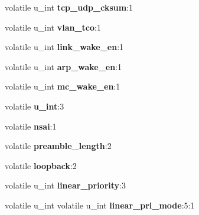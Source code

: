 \begin{DoxyCompactItemize}
\item 
\mbox{\label{structfxp__cb__config_aeeced7285a24bb1a443bde72797e8047}} 
volatile u\+\_\+int {\bfseries tcp\+\_\+udp\+\_\+cksum}\+:1
\item 
\mbox{\label{structfxp__cb__config_a2326a2664ff8b0bddbc718dc1b5c23f4}} 
volatile u\+\_\+int {\bfseries vlan\+\_\+tco}\+:1
\item 
\mbox{\label{structfxp__cb__config_a76c34c338055b83715b609295990867a}} 
volatile u\+\_\+int {\bfseries link\+\_\+wake\+\_\+en}\+:1
\item 
\mbox{\label{structfxp__cb__config_a8d7c8487aceeeb143e1fe45c7f6da4af}} 
volatile u\+\_\+int {\bfseries arp\+\_\+wake\+\_\+en}\+:1
\item 
\mbox{\label{structfxp__cb__config_a67f44d3bca0f453fae177b7d98001d4e}} 
volatile u\+\_\+int {\bfseries mc\+\_\+wake\+\_\+en}\+:1
\item 
\mbox{\label{structfxp__cb__config_a1b1ae5abb69f2274a6be1a6b22b1095b}} 
volatile {\bfseries u\+\_\+int}\+:3
\item 
\mbox{\label{structfxp__cb__config_ae84ea49fca6cb612021a2b01946896ed}} 
volatile {\bfseries nsai}\+:1
\item 
\mbox{\label{structfxp__cb__config_ad7c9b065a2ae19dbc31cef5dd71d24ce}} 
volatile {\bfseries preamble\+\_\+length}\+:2
\item 
\mbox{\label{structfxp__cb__config_a846d138c6248bb3aab015bd3978ff61e}} 
volatile {\bfseries loopback}\+:2
\item 
\mbox{\label{structfxp__cb__config_a69e319392917735ce527720cdd994d1e}} 
volatile u\+\_\+int {\bfseries linear\+\_\+priority}\+:3
\item 
\mbox{\label{structfxp__cb__config_abd91e6cb2f9500503a887150f9039f29}} 
volatile u\+\_\+int volatile u\+\_\+int {\bfseries linear\+\_\+pri\+\_\+mode}\+:5\+:1

\end{DoxyCompactItemize}
